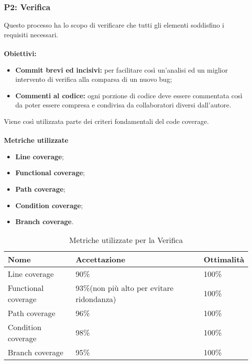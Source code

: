 \subsubsection{P2: Verifica}
Questo processo ha lo scopo di verificare che tutti gli elementi soddisfino i requisiti necessari. \\\\
\textbf{Obiettivi:}
\begin{itemize}
	\item{\textbf{Commit brevi ed incisivi:} per facilitare così un'analisi ed un miglior intervento di verifica alla comparsa di un nuovo bug;}
	\item{\textbf{Commenti al codice:} ogni porzione di codice deve essere commentata così da poter essere compresa e condivisa da collaboratori diversi dall'autore.}
\end{itemize}
Viene così utilizzata parte dei criteri fondamentali del code coverage\pedice.\\\\
\textbf{Metriche utilizzate}
\begin{itemize}
	\item{\textbf{Line coverage};}
	\item{\textbf{Functional coverage};}
	\item{\textbf{Path coverage};}
	\item{\textbf{Condition coverage};}
	\item{\textbf{Branch coverage}.}
\end{itemize}
\begin{table}[!htpb]
	\centering
	\renewcommand{\arraystretch}{2} 
	\begin{tabular}{|l|l|l|}
		\rowcolor{orange!50}
		\hline
		\textbf{Nome} & \textbf{Accettazione} & \textbf{Ottimalità} \\
		\hline
		Line coverage & 90\% & 100\% \\
		\hline
		Functional coverage & 93\%(non più alto per evitare ridondanza) & 100\% \\
		\hline
		Path coverage & 96\% & 100\% \\
		\hline
		Condition coverage & 98\% & 100\% \\
		\hline
		Branch coverage & 95\% & 100\% \\
		\hline
	\end{tabular}
	\caption{Metriche utilizzate per la Verifica}
\end{table}
\newpage
